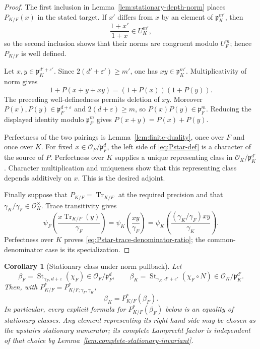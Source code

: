 \documentclass[11pt]{amsart}
\newtheorem{corollary}[theorem]{Corollary}
\theoremstyle{definition}
\theoremstyle{remark}
\newcommand{\cO}{\mathcal O}
\newcommand{\p}{\mathfrak p}
\newcommand{\Tr}{\operatorname{Tr}}
\begin{document}
\begin{proof}
The first inclusion in Lemma~\ref{lem:stationary-depth-norm} places
$P_{K/F}(x)$ in the stated target.  If $x'$ differs from $x$ by an
element of $\p_K^{m'}$, then
\[
 \frac{1+x'}{1+x}\in U_K^{m'},
\]
so the second inclusion shows that their norms are congruent modulo
$U_F^m$; hence $P_{K/F}$ is well defined.

Let $x,y\in\p_K^{d'+\varepsilon'}$.  Since
$2(d'+\varepsilon')\ge m'$, one has $xy\in\p_K^{m'}$.  Multiplicativity
of norm gives
\[
 1+P(x+y+xy)=(1+P(x))(1+P(y)).
\]
The preceding well-definedness permits deletion of $xy$.  Moreover
$P(x),P(y)\in\p_F^{d+\varepsilon}$ and
$2(d+\varepsilon)\ge m$, so $P(x)P(y)\in\p_F^m$.  Reducing the displayed
identity modulo $\p_F^m$ gives $P(x+y)=P(x)+P(y)$.

Perfectness of the two pairings is Lemma~\ref{lem:finite-duality}, once
over $F$ and once over $K$.  For fixed $x\in\cO_F/\p_F^d$, the left
side of \eqref{eq:Pstar-def} is a character of the source of $P$.
Perfectness over $K$ supplies a unique representing class in
$\cO_K/\p_K^{d'}$.  Character multiplication and uniqueness show that
this representing class depends additively on $x$.  This is the desired
adjoint.

Finally suppose that $P_{K/F}=\Tr_{K/F}$ at the required precision and
that $\gamma_K/\gamma_F\in\cO_K^\times$.  Trace transitivity gives
\[
 \psi_F\!\left(\frac{x\Tr_{K/F}(y)}{\gamma_F}\right)
 =\psi_K\!\left(\frac{xy}{\gamma_F}\right)
 =\psi_K\!\left(
   \frac{(\gamma_K/\gamma_F)xy}{\gamma_K}\right).
\]
Perfectness over $K$ proves
\eqref{eq:Pstar-trace-denominator-ratio}; the common-denominator case is
its specialization.
\end{proof}

\begin{corollary}[Stationary class under norm pullback]
\label{cor:stationary-class-under-norm}
Let
\[
 \beta_F=\operatorname{St}_{\gamma_F,d+\varepsilon}(\chi_F)
       \in\cO_F/\p_F^d,
 \qquad
 \beta_K=\operatorname{St}_{\gamma_K,d'+\varepsilon'}(\chi_F\circ N)
       \in\cO_K/\p_K^{d'}.
\]
Then, with
$P^*_{K/F}=P^*_{K/F;\gamma_F,\gamma_K}$,
\begin{equation}\label{eq:stationary-class-adjoint}
 \beta_K=P^*_{K/F}(\beta_F).
\end{equation}
In particular, every explicit formula for $P^*_{K/F}(\beta_F)$ below
is an equality of stationary classes.  Any element representing its
right-hand side may be chosen as the upstairs stationary numerator;
its complete Lamprecht factor is independent of that choice by
Lemma~\ref{lem:complete-stationary-invariant}.
\end{corollary}
\end{document}
